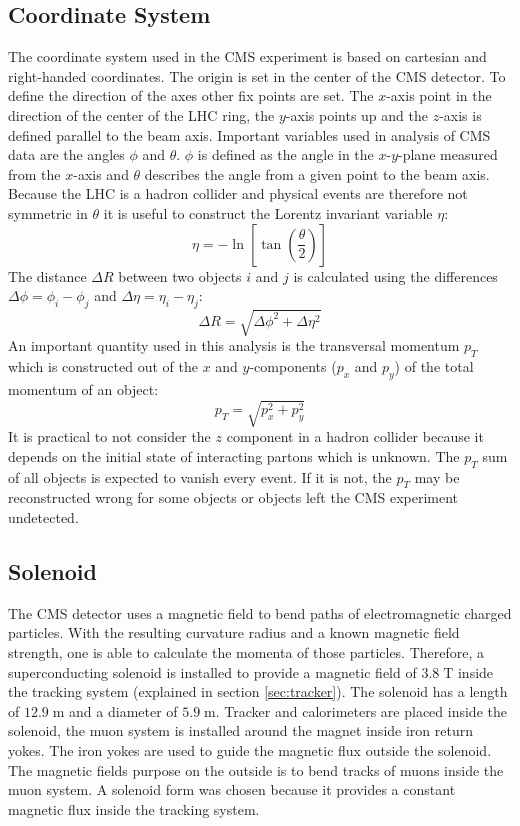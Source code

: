 \subsection{Coordinate System}
\label{sec:coordinate}
	The coordinate system used in the CMS experiment is based on cartesian and right-handed coordinates. The origin is set in the center of the CMS detector. To define the direction of the axes other fix points are set. The $x$-axis point in the direction of the center of the LHC ring, the $y$-axis points up and the $z$-axis is defined parallel to the beam axis. Important variables used in analysis of CMS data are the angles $\phi$ and $\theta$. $\phi$ is defined as the angle in the $x$-$y$-plane measured from the $x$-axis and $\theta$ describes the angle from a given point to the beam axis. Because the LHC is a hadron collider and physical events are therefore not symmetric in $\theta$ it is useful to construct the Lorentz invariant variable $\eta$:
	\begin{equation}
	\eta = - \ln \left[\tan\left( \frac{\theta}{2}\right) \right]
	\end{equation} 
	The distance $\Delta R$ between two objects $i$ and $j$ is calculated using the differences $\Delta \phi = \phi_i - \phi_j$ and $\Delta \eta = \eta_i - \eta_j$:
	\begin{equation}
	\Delta R = \sqrt{\Delta \phi ^2 + \Delta \eta ^2}
	\end{equation}
	An important quantity used in this analysis is the transversal momentum $p_T$ which is constructed out of the $x$ and $y$-components ($p_x$ and $p_y$) of the total momentum of an object:
	\begin{equation}
	p_T = \sqrt{p_x^2 + p_y^2}
	\end{equation} 
	It is practical to not consider the $z$ component in a hadron collider because it depends on the initial state of interacting partons which is unknown. The $p_T$ sum of all objects is expected to vanish every event. If it is not, the $p_T$ may be reconstructed wrong for some objects or objects left the CMS experiment undetected.
	
\subsection{Solenoid}
	The CMS detector uses a magnetic field to bend paths of electromagnetic charged particles. With the resulting curvature radius and a known magnetic field strength, one is able to calculate the momenta of those particles. Therefore, a superconducting solenoid is installed to provide a magnetic field of $3.8\;\text{T}$ inside the tracking system (explained in section \ref{sec:tracker}). The solenoid has a length of $12.9\;\text{m}$ and a diameter of $5.9\;\text{m}$. Tracker and calorimeters are placed inside the solenoid, the muon system is installed around the magnet inside iron return yokes. The iron yokes are used to guide the magnetic flux outside the solenoid. The magnetic fields purpose on the outside is to bend tracks of muons inside the muon system. A solenoid form was chosen because it provides a constant magnetic flux inside the tracking system.
	
